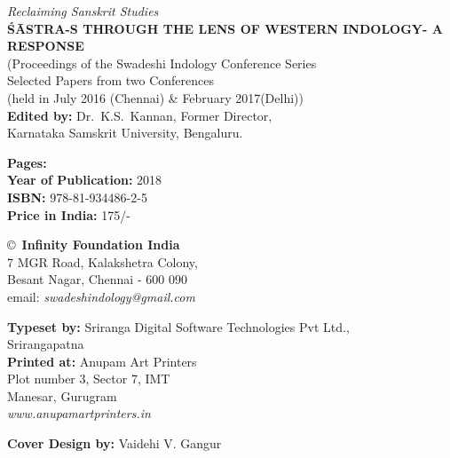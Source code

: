 \thispagestyle{empty}
\noindent
{\fontsize{9}{11}\selectfont\sl Reclaiming Sanskrit Studies}\\
{\bf ŚĀSTRA-S THROUGH THE LENS OF WESTERN INDOLOGY\newline - A RESPONSE}\\ 
(Proceedings of the Swadeshi Indology Conference Series\\
Selected Papers from two Conferences\\ 
(held in July 2016 (Chennai) \& February 2017(Delhi))\\
{\bf Edited by:} Dr.\ K.S.\ Kannan, Former Director,\\ 
Karnataka Samskrit University, Bengaluru.
\vfill

\noindent
{\bf Pages:} \pageref{book:end}\\
{\bf Year of Publication:} 2018\\
{\bf ISBN:} 978-81-934486-2-5\\
{\bf Price in India:} 175/-
\vfill

\noindent
\copyright\ {\bf Infinity Foundation India}\\ 
7 MGR Road, Kalakshetra Colony,\\ 
Besant Nagar, Chennai - 600 090\\
email: {\sl swadeshindology@gmail.com} 
\vfill

\noindent
{\bf Typeset by:} Sriranga Digital Software Technologies Pvt Ltd.,\\ 
Srirangapatna\\

\noindent
{\bf Printed at:} Anupam Art Printers\\
Plot number 3, Sector 7, IMT\\
Manesar, Gurugram\\
{\sl www.anupamartprinters.in}
\noindent

\bigskip

{\bf Cover Design by:} Vaidehi V. Gangur
